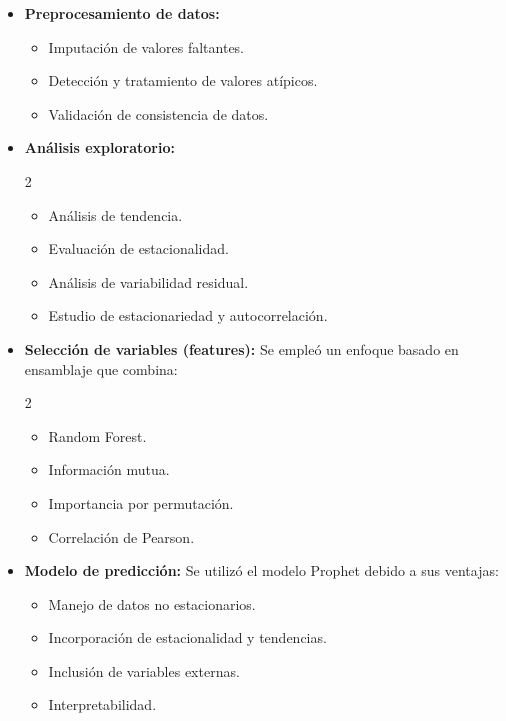 \begin{itemize}
    \item \textbf{Preprocesamiento de datos:}
    \begin{itemize}
        \item Imputación de valores faltantes.
        \item Detección y tratamiento de valores atípicos.
        \item Validación de consistencia de datos.
    \end{itemize}

    \item \textbf{Análisis exploratorio:}
    \begin{multicols}{2}
    \begin{itemize}
        \item Análisis de tendencia.
        \item Evaluación de estacionalidad.
        \item Análisis de variabilidad residual.
        \item Estudio de estacionariedad y autocorrelación.
    \end{itemize}
    \end{multicols}
    \item \textbf{Selección de variables (features):}
    Se empleó un enfoque basado en ensamblaje que combina:
    
    \begin{multicols}{2}
    \begin{itemize}
        \item Random Forest.
        \item Información mutua.
        \item Importancia por permutación.
        \item Correlación de Pearson.
    \end{itemize}
    \end{multicols}

    \item \textbf{Modelo de predicción:}
    Se utilizó el modelo Prophet debido a sus ventajas:
    \begin{itemize}
        \item Manejo de datos no estacionarios.
        \item Incorporación de estacionalidad y tendencias.
        \item Inclusión de variables externas.
        \item Interpretabilidad.
    \end{itemize}


\end{itemize}
